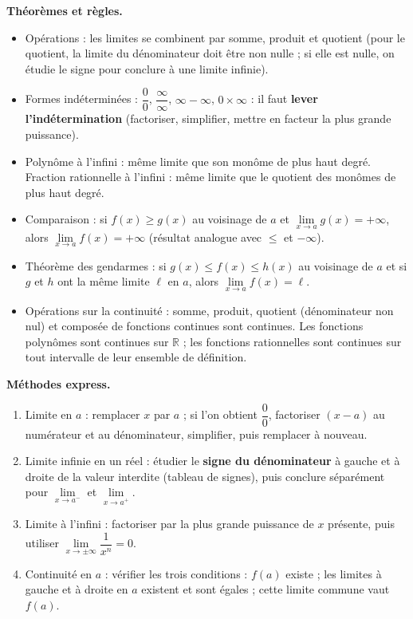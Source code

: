\documentclass[11pt]{article}
\newcommand{\cle}[1]{{\popxbold\color{popdark}#1}}
\begin{document}
\begin{aretenir}[L'essentiel de la le\c{c}on]
\textbf{Th\'eor\`emes et r\`egles.}
\begin{itemize}
  \item \cle{Op\'erations} : les limites se combinent par somme, produit et quotient (pour le quotient, la limite du d\'enominateur doit \^etre non nulle ; si elle est nulle, on \'etudie le signe pour conclure \`a une limite infinie).
  \item \cle{Formes ind\'etermin\'ees} : $\dfrac{0}{0}$, $\dfrac{\infty}{\infty}$, $\infty-\infty$, $0\times\infty$ : il faut \textbf{lever l'ind\'etermination} (factoriser, simplifier, mettre en facteur la plus grande puissance).
  \item \cle{Polyn\^ome \`a l'infini} : m\^eme limite que son mon\^ome de plus haut degr\'e. \cle{Fraction rationnelle \`a l'infini} : m\^eme limite que le quotient des mon\^omes de plus haut degr\'e.
  \item \cle{Comparaison} : si $f(x)\geq g(x)$ au voisinage de $a$ et $\lim\limits_{x\to a} g(x)=+\infty$, alors $\lim\limits_{x\to a} f(x)=+\infty$ (r\'esultat analogue avec $\leq$ et $-\infty$).
  \item \cle{Th\'eor\`eme des gendarmes} : si $g(x)\leq f(x)\leq h(x)$ au voisinage de $a$ et si $g$ et $h$ ont la m\^eme limite $\ell$ en $a$, alors $\lim\limits_{x\to a} f(x)=\ell$.
  \item \cle{Op\'erations sur la continuit\'e} : somme, produit, quotient (d\'enominateur non nul) et compos\'ee de fonctions continues sont continues. Les fonctions polyn\^omes sont continues sur $\mathbb{R}$ ; les fonctions rationnelles sont continues sur tout intervalle de leur ensemble de d\'efinition.
\end{itemize}

\textbf{M\'ethodes express.}
\begin{enumerate}
  \item Limite en $a$ : remplacer $x$ par $a$ ; si l'on obtient $\dfrac{0}{0}$, factoriser $(x-a)$ au num\'erateur et au d\'enominateur, simplifier, puis remplacer \`a nouveau.
  \item Limite infinie en un r\'eel : \'etudier le \textbf{signe du d\'enominateur} \`a gauche et \`a droite de la valeur interdite (tableau de signes), puis conclure s\'epar\'ement pour $\lim\limits_{x\to a^-}$ et $\lim\limits_{x\to a^+}$.
  \item Limite \`a l'infini : factoriser par la plus grande puissance de $x$ pr\'esente, puis utiliser $\lim\limits_{x\to\pm\infty}\dfrac{1}{x^n}=0$.
  \item Continuit\'e en $a$ : v\'erifier les trois conditions : $f(a)$ existe ; les limites \`a gauche et \`a droite en $a$ existent et sont \'egales ; cette limite commune vaut $f(a)$.
\end{enumerate}
\end{aretenir}
\end{document}
